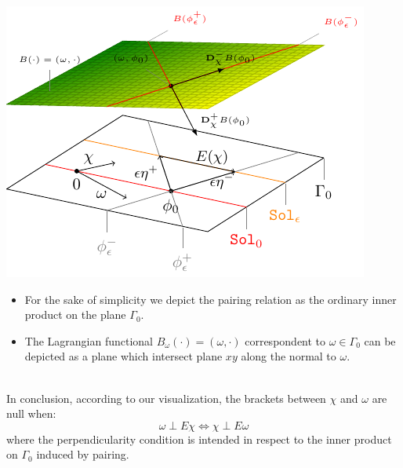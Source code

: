 \documentclass[Main]{subfiles}
\begin{document}
		\vspace{1mm}		
		\begin{minipage}{0.5\textwidth}
			\includegraphics[width=\textwidth]{Pictures/compsupp_GeometricPictureLinear}
		\end{minipage}
		\begin{minipage}{0.5\textwidth}
			\begin{itemize}
				\item For the sake of simplicity we depict the pairing relation as the ordinary inner product  on the plane $\Gamma_0$.
				\item The Lagrangian functional $B_\omega (\cdot) = (\omega, \cdot)$ correspondent to  $\omega \in \Gamma_0$  can be depicted as a plane which intersect plane $ x y$ along the normal to $\omega$.
			\end{itemize}
		\end{minipage}
		\vspace{1mm}\\	
	
		In conclusion, according to our visualization, the brackets between $\chi$ and $\omega$ are null when:
		\begin{displaymath}
		 \omega \perp E \chi \Longleftrightarrow \chi \perp E \omega
		\end{displaymath}
		where the perpendicularity condition is intended in respect to the inner product on $\Gamma_0$ induced by pairing.
		
\end{document}
